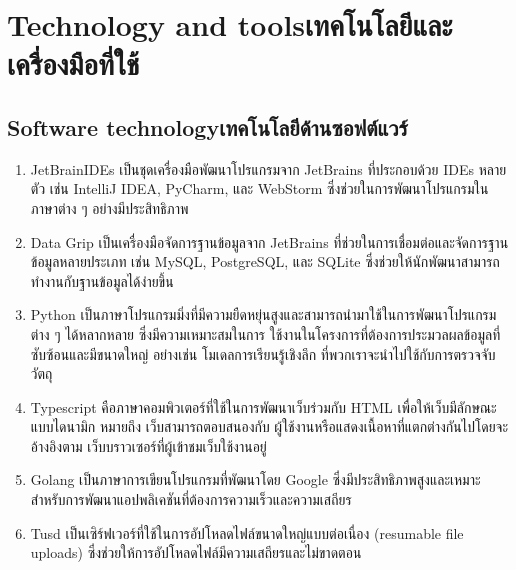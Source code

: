 \section{\ifenglish Technology and tools\else เทคโนโลยีและเครื่องมือที่ใช้\fi}


\subsection{\ifenglish Software technology\else เทคโนโลยีด้านซอฟต์แวร์\fi}

\begin{enumerate}

    \item JetBrainIDEs เป็นชุดเครื่องมือพัฒนาโปรแกรมจาก JetBrains ที่ประกอบด้วย IDEs หลายตัว เช่น IntelliJ IDEA, PyCharm, และ WebStorm ซึ่งช่วยในการพัฒนาโปรแกรมในภาษาต่าง ๆ อย่างมีประสิทธิภาพ

    \item Data Grip เป็นเครื่องมือจัดการฐานข้อมูลจาก JetBrains ที่ช่วยในการเชื่อมต่อและจัดการฐานข้อมูลหลายประเภท เช่น MySQL, PostgreSQL, และ SQLite ซึ่งช่วยให้นักพัฒนาสามารถทำงานกับฐานข้อมูลได้ง่ายขึ้น

    \item Python เป็นภาษาโปรแกรมมิ่งที่มีความยืดหยุ่นสูงและสามารถนำมาใช้ในการพัฒนาโปรแกรมต่าง ๆ ได้หลากหลาย ซึ่งมีความเหมาะสมในการ
    ใช้งานในโครงการที่ต้องการประมวลผลข้อมูลที่ซับซ้อนและมีขนาดใหญ่ อย่างเช่น โมเดลการเรียนรู้เชิงลึก ที่พวกเราจะนำไปใช้กับการตรวจจับวัตถุ
    
    \item Typescript คือภาษาคอมพิวเตอร์ที่ใช้ในการพัฒนาเว็บร่วมกับ HTML เพื่อให้เว็บมีลักษณะแบบไดนามิก หมายถึง เว็บสามารถตอบสนองกับ
    ผู้ใช้งานหรือแสดงเนื้อหาที่แตกต่างกันไปโดยจะอ้างอิงตาม เว็บบราวเซอร์ที่ผู้เข้าชมเว็บใช้งานอยู่ 

    \item Golang เป็นภาษาการเขียนโปรแกรมที่พัฒนาโดย Google ซึ่งมีประสิทธิภาพสูงและเหมาะสำหรับการพัฒนาแอปพลิเคชันที่ต้องการความเร็วและความเสถียร

    \item Tusd เป็นเซิร์ฟเวอร์ที่ใช้ในการอัปโหลดไฟล์ขนาดใหญ่แบบต่อเนื่อง (resumable file uploads) ซึ่งช่วยให้การอัปโหลดไฟล์มีความเสถียรและไม่ขาดตอน


\end{enumerate}
